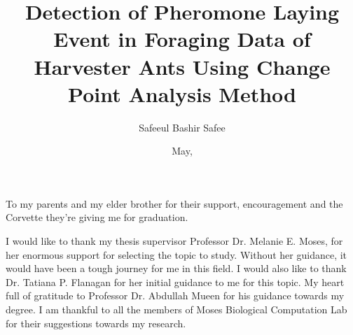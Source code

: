 \documentclass[botnum, fleqn]{unmeethesis}
\begin{document}
\frontmatter




\title{Detection of Pheromone Laying Event in Foraging Data of Harvester Ants Using Change Point Analysis Method}

\author{Safeeul Bashir Safee}





\date{May, \thisyear}

\maketitle


\begin{dedication}
   To my parents and my elder brother for their support,
   encouragement and the Corvette they're giving me for graduation. \\[3ex]
\end{dedication}

\begin{acknowledgments}
   \vspace{1.1in}
  I would like to thank my thesis supervisor Professor Dr. Melanie E. Moses, for her enormous support for selecting the topic to study. Without her guidance, it would have been a tough journey for me in this field. I would also like to thank Dr. Tatiana P. Flanagan for her initial guidance to me for this topic. My heart full of gratitude to Professor Dr. Abdullah Mueen for his guidance towards my degree. 
  I am thankful to all the members of Moses Biological Computation Lab for their suggestions towards my research. 
\end{acknowledgments}

\maketitleabstract %
\end{document}
